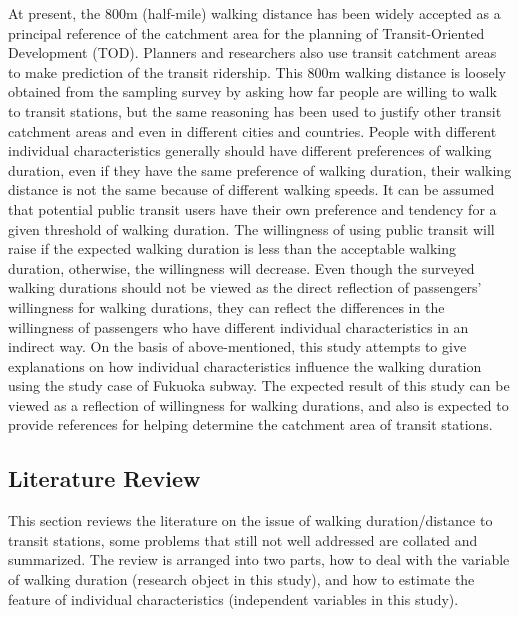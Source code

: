 %
At present, the 800m (half-mile) walking distance has been widely accepted as a principal reference of the catchment area for the planning of Transit-Oriented Development (TOD). Planners and researchers also use transit catchment areas to make prediction of the transit ridership. This 800m walking distance is loosely obtained from the sampling survey by asking how far people are willing to walk to transit stations, but the same reasoning has been used to justify other transit catchment areas and even in different cities and countries. People with different individual characteristics generally should have different preferences of walking duration, even if they have the same preference of walking duration, their walking distance is not the same because of different walking speeds. It can be assumed that potential public transit users have their own preference and tendency for a given threshold of walking duration. The willingness of using public transit will raise if the expected walking duration is less than the acceptable walking duration, otherwise, the willingness will decrease. Even though the surveyed walking durations should not be viewed as the direct reflection of passengers' willingness for walking durations, they can reflect the differences in the willingness of passengers who have different individual characteristics in an indirect way. On the basis of above-mentioned, this study attempts to give explanations on how individual characteristics influence the walking duration using the study case of Fukuoka subway. The expected result of this study can be viewed as a reflection of willingness for walking durations, and also is expected to provide references for helping determine the catchment area of transit stations.
\subsection{Literature Review}
This section reviews the literature on the issue of walking duration/distance to transit stations, some problems that still not well addressed are collated and summarized. The review is arranged into two parts, how to deal with the variable of walking duration (research object in this study), and how to estimate the feature of individual characteristics (independent variables in this study).

